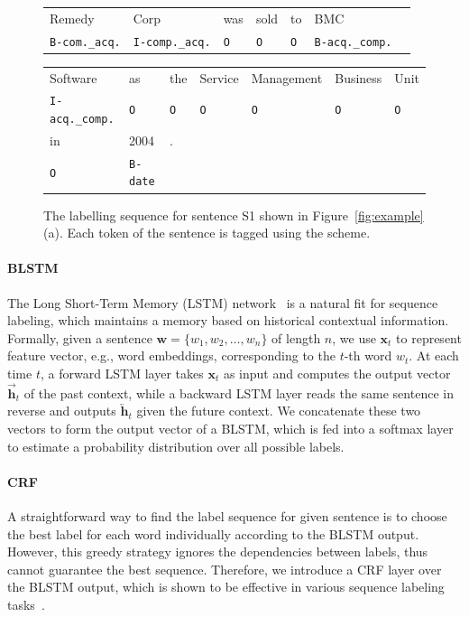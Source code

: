 \begin{figure}
\centering
\scriptsize
\begin{tabular}{lllllll}
\toprule
Remedy & Corp & was & sold & to & BMC & \\
\rowcolor{Gray} \texttt{B-com.\_acq.} & \texttt{I-comp.\_acq.} & \texttt{O} & \texttt{O} & \texttt{O} & \texttt{B-acq.\_comp.} &\\
\end{tabular}
\begin{tabular}{lllllll}
Software & as & the & Service & Management & Business & Unit\\
\rowcolor{Gray} \texttt{I-acq.\_comp.} & \texttt{O} & \texttt{O} & \texttt{O} & \texttt{O} & \texttt{O} & \texttt{O}\\
in & 2004 &.&&&&\\
\rowcolor{Gray} \texttt{O} & \texttt{B-date} &&&&&\\
\bottomrule
\end{tabular}

\caption{The labelling sequence for sentence S1 shown in Figure~\ref{fig:example} (a). Each token of the sentence is tagged using the \BIO
scheme. \label{fig:ls}}

\end{figure}


\paragraph{BLSTM}
The Long Short-Term Memory (LSTM) network~\cite{hochreiter1997long} is a natural fit for sequence labeling, which maintains a memory based
on historical contextual information. Formally, given a sentence $\bm{w} = \{w_1, w_2, \dots, w_n\}$ of length $n$, we use $\textbf{x}_t$
to represent feature vector, e.g., word embeddings, corresponding to the $t$-th word $w_t$. At each time $t$, a forward LSTM layer takes
$\textbf{x}_t$ as input and computes the output vector $\overrightarrow{\textbf{h}}_t$ of the past context, while a backward LSTM layer
reads the same sentence in reverse and outputs $\overleftarrow{\textbf{h}}_t$ given the future context. We concatenate these two vectors to
form the output vector of a BLSTM, which is fed into a softmax layer to estimate a probability distribution over all possible labels.

\paragraph{CRF}
A straightforward way to find the label sequence for given sentence is to choose the
best label for each word individually according to the BLSTM output.
However, this greedy strategy ignores the dependencies between labels, thus cannot guarantee the best sequence.  %
Therefore, we introduce a CRF layer over the BLSTM output, which is shown to be effective in various sequence labeling tasks~\cite{collobert2011natural,huang2015bidirectional}. %

